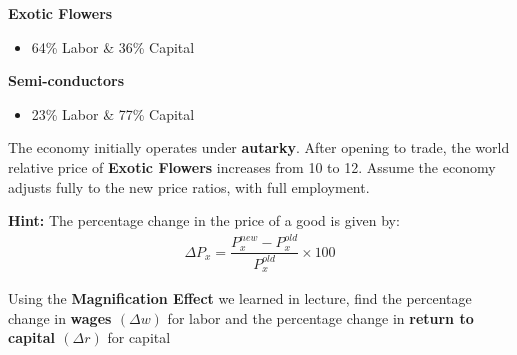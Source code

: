 \documentclass[12pt]{exam}
\begin{document}
\begin{questions}
\begin{multicols}{2}
  \centering 
  \textbf{Exotic Flowers}
  \begin{itemize}
    \item 64\% Labor \& 36\% Capital 
  \end{itemize}
  
  \columnbreak
  
  \centering
  \textbf{Semi-conductors}
  \begin{itemize}
    \item 23\% Labor \& 77\% Capital
  \end{itemize}
  \end{multicols}

The economy initially operates under \textbf{autarky}. 
After opening to trade, the world relative price of \textbf{Exotic Flowers} increases from 10 to 12. 
Assume the economy adjusts fully to the new price ratios, with full employment. 

\textbf{Hint:} 
The percentage change in the price of a good is given by:
\begin{align*}
  \Delta P_{x} = \dfrac{P_{x}^{new} - P_{x}^{old}}{P_{x}^{old}} \times 100
\end{align*}

Using the \textbf{Magnification Effect} we learned in lecture, find the percentage change in \textbf{wages $(\Delta w)$} for labor and the percentage change in \textbf{return to capital $(\Delta r)$} for capital

\end{questions}
\end{document}

